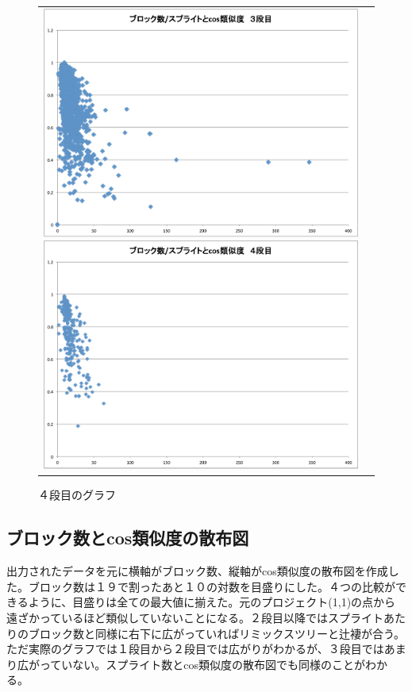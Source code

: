 \documentclass[a4paper,10pt,onecolumn,oneside,openany]{jsbook}
\begin{document}
\begin{figure}[h]
\begin{tabular}{cc}
 	\begin{minipage}[t]{0.45\hsize}
	 \centering
	 \includegraphics[keepaspectratio, scale = 0.25]{block_per_splite_3.pdf}
	 \caption{３段目のグラフ}
	 \label{third_block_per_splite}
	\end{minipage}
        \begin{minipage}[t]{0.45\hsize}
	 \centering
	 \includegraphics[keepaspectratio, scale = 0.25]{block_per_splite_4.pdf}
	 \caption{４段目のグラフ}
	 \label{fourth_block_per_splite}
	\end{minipage}
 \end{tabular}
 \end{figure}

\newpage
\subsection{ブロック数とcos類似度の散布図}
 出力されたデータを元に横軸がブロック数、縦軸がcos類似度の散布図を作成した。ブロック数は１９で割ったあと１０の対数を目盛りにした。４つの比較ができるように、目盛りは全ての最大値に揃えた。元のプロジェクト(1,1)の点から遠ざかっているほど類似していないことになる。２段目以降ではスプライトあたりのブロック数と同様に右下に広がっていればリミックスツリーと辻褄が合う。ただ実際のグラフでは１段目から２段目では広がりがわかるが、３段目ではあまり広がっていない。スプライト数とcos類似度の散布図でも同様のことがわかる。
\end{document}
